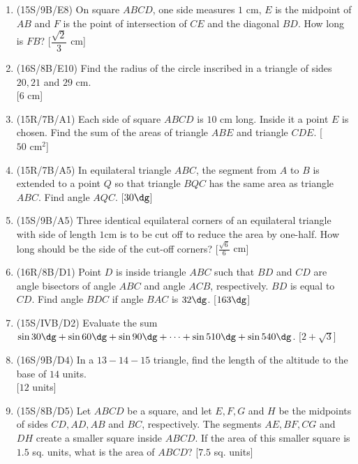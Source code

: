 \documentclass[11pt,paper=letter]{scrartcl}
\begin{document}
\begin{enumerate}

\item (15S/9B/E8) On square $ABCD$, one side measures $1 \text{ cm}$, $E$ is the midpoint of $AB$ and $F$ is the point of intersection of $CE$ and the diagonal $BD$. How long is $FB$? \hfill [$\dfrac{\sqrt{2}}{3} \text{ cm}$]

\item (16S/8B/E10) Find the radius of the circle inscribed in a triangle of sides $20, 21$ and $29 \text{ cm}$. \\ \phantom{.} \hfill [$6 \text{ cm}$]

\item (15R/7B/A1) Each side of square $ABCD$ is $10 \text{ cm}$ long. Inside it a point $E$ is chosen. Find the sum of the areas of triangle $ABE$ and triangle $CDE$. \hfill [$50 \text{ cm}^2$]

\item (15R/7B/A5) In equilateral triangle $ABC$, the segment from $A$ to $B$ is extended to a point $Q$ so that triangle $BQC$ has the same area as triangle $ABC$. Find angle $AQC$. \hfill [$30\dg$]

\item (15S/9B/A5) Three identical equilateral corners of an equilateral triangle with side of length $1 \text{cm}$ is to be cut off to reduce the area by one-half. How long should be the side of the cut-off corners? \hfill [$\frac{\sqrt{6}}{6} \text{ cm}$]

\item (16R/8B/D1) Point $D$ is inside triangle $ABC$ such that $BD$ and $CD$ are angle bisectors of angle $ABC$ and angle $ACB$, respectively. $BD$ is equal to $CD$. Find angle $BDC$ if angle $BAC$ is $32\dg$. \hfill [$163\dg$]

\item (15S/IVB/D2) Evaluate the sum $\sin{30\dg} + \sin{60\dg} + \sin{90\dg} + \cdots + \sin{510\dg} + \sin{540\dg}$. \hfill [$2 + \sqrt{3}$]

\item (16S/9B/D4) In a $13-14-15$ triangle, find the length of the altitude to the base of $14$ units. \\ \phantom{.} \hfill [$12$ units]

\item (15S/8B/D5) Let $ABCD$ be a square, and let $E , F , G$ and $H$ be the midpoints of sides $CD , AD , AB$ and $BC$, respectively. The segments $AE , BF , CG$ and $DH$ create a smaller square inside $ABCD$. If the area of this smaller square is $1.5$ sq. units, what is the area of $ABCD$? \hfill [$7.5$ sq. units]


\end{enumerate}
\end{document}
